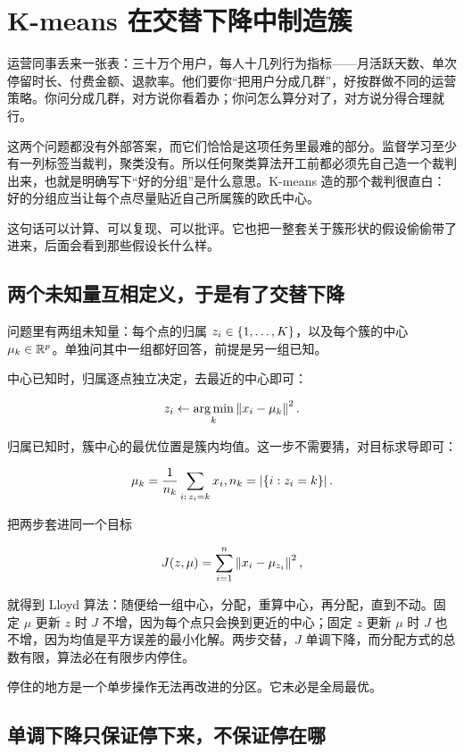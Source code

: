 \section{K-means 在交替下降中制造簇}
\label{sec:13-Machine-Learning/05-Clustering-and-Data-Geometry/01}

运营同事丢来一张表：三十万个用户，每人十几列行为指标——月活跃天数、单次停留时长、付费金额、退款率。他们要你``把用户分成几群''，好按群做不同的运营策略。你问分成几群，对方说你看着办；你问怎么算分对了，对方说分得合理就行。

这两个问题都没有外部答案，而它们恰恰是这项任务里最难的部分。监督学习至少有一列标签当裁判，聚类没有。所以任何聚类算法开工前都必须先自己造一个裁判出来，也就是明确写下``好的分组''是什么意思。K-means 造的那个裁判很直白：好的分组应当让每个点尽量贴近自己所属簇的欧氏中心。

这句话可以计算、可以复现、可以批评。它也把一整套关于簇形状的假设偷偷带了进来，后面会看到那些假设长什么样。

\subsection{两个未知量互相定义，于是有了交替下降}

问题里有两组未知量：每个点的归属 \(z_i\in\left\{1,\ldots,K\right\}\)，以及每个簇的中心 \(\mu_k\in\mathbb{R}^p\)。单独问其中一组都好回答，前提是另一组已知。

中心已知时，归属逐点独立决定，去最近的中心即可：

\[
z_i \leftarrow \operatorname*{arg\,min}_{k} \left\lVert x_i - \mu_k\right\rVert^2 .
\]

归属已知时，簇中心的最优位置是簇内均值。这一步不需要猜，对目标求导即可：

\[
\mu_k = \frac{1}{n_k}\sum_{i:\,z_i=k} x_i ,
\space n_k=\left|\left\{i: z_i=k\right\}\right| .
\]

把两步套进同一个目标

\[
J(z,\mu)=\sum_{i=1}^{n}\left\lVert x_i-\mu_{z_i}\right\rVert^2 ,
\]

就得到 Lloyd 算法：随便给一组中心，分配，重算中心，再分配，直到不动。固定 \(\mu\) 更新 \(z\) 时 \(J\) 不增，因为每个点只会换到更近的中心；固定 \(z\) 更新 \(\mu\) 时 \(J\) 也不增，因为均值是平方误差的最小化解。两步交替，\(J\) 单调下降，而分配方式的总数有限，算法必在有限步内停住。

停住的地方是一个单步操作无法再改进的分区。它未必是全局最优。

\subsection{单调下降只保证停下来，不保证停在哪}

